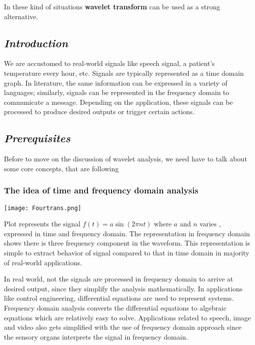 \documentclass[12pt, a4paper]{article} %
\begin{document}
In these kind of situations {\bf wavelet transform} can be used as a strong alternative.

\subsection{\slshape Introduction}

We are accustomed to real-world signals like speech signal, a patient's temperature every hour, etc. Signals are typically represented as a time domain graph. In literature, the same information can be expressed in a variety of languages; similarly, signals can be represented in the frequency domain to communicate a message. Depending on the application, these signals can be processed to produce desired outputs or trigger certain actions.


\subsection{\slshape Prerequisites}
Before to move on the discussion of wavelet analysis, we need have to talk about some core concepts, that are following

\subsubsection{The idea of time and frequency domain analysis}

    \begin{center}
        \texttt{[image: Fourtrans.png]}
    \end{center}

Plot  represents the signal $\displaystyle f(t) = a\sin(2\pi n t)$ where $a$ and $n$ varies , expressed in time and frequency domain. The representation in frequency domain shows there is three frequency component in the waveform. This representation is simple to extract behavior of signal compared to that in time domain in majority of real-world applications.

\vspace*{0.5cm}

In real world, not the signals are processed in frequency domain to arrive at desired output, since they simplify the analysis mathematically. In applications like control engineering, differential equations are used to represent systems. Frequency domain analysis converts the differential equations to algebraic equations which are relatively easy to solve. Applications related to speech, image and video also gets simplified with the use of frequency domain approach since the sensory organs interprets the signal in frequency domain.
\end{document}
